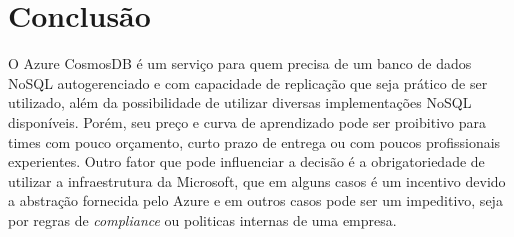 \documentclass[12pt]{article}
\begin{document}
\section{Conclusão}
O Azure CosmosDB é um serviço para quem precisa de um banco de dados NoSQL autogerenciado e com capacidade de replicação que seja prático de ser utilizado, além da possibilidade de utilizar diversas implementações NoSQL disponíveis. Porém, seu preço e curva de
aprendizado pode ser proibitivo para times com pouco orçamento, curto prazo de entrega ou com poucos profissionais experientes. Outro fator que pode influenciar a decisão é a obrigatoriedade de utilizar a infraestrutura da Microsoft, que em alguns casos é um incentivo devido a abstração fornecida pelo
Azure e em outros casos pode ser um impeditivo, seja por regras de \textit{compliance} ou politicas internas de uma empresa. 


\end{document}
